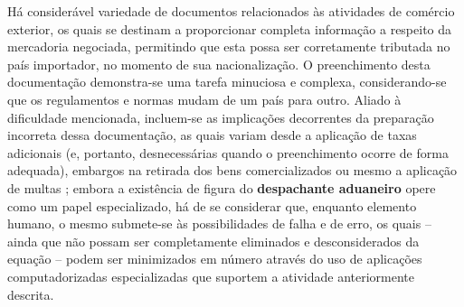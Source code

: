 Há considerável variedade de documentos relacionados às atividades de comércio exterior, os quais se destinam a proporcionar completa informação a respeito da mercadoria negociada, permitindo que esta possa ser corretamente tributada no país importador, no momento de sua nacionalização. O preenchimento desta documentação demonstra-se uma tarefa minuciosa e complexa, considerando-se que os regulamentos e normas mudam de um país para outro. Aliado à dificuldade mencionada, incluem-se as implicações decorrentes da preparação incorreta dessa documentação, as quais variam desde a aplicação de taxas adicionais (e, portanto, desnecessárias quando o preenchimento ocorre de forma adequada), embargos na retirada dos bens comercializados ou mesmo a aplicação de multas \cite{segalis2015fundamentos}; embora a existência de figura do \textbf{despachante aduaneiro} opere como um papel especializado, há de se considerar que, enquanto elemento humano, o mesmo submete-se às possibilidades de falha e de erro, os quais -- ainda que não possam ser completamente eliminados e desconsiderados da equação -- podem ser minimizados em número através do uso de aplicações computadorizadas especializadas que suportem a atividade anteriormente descrita.
